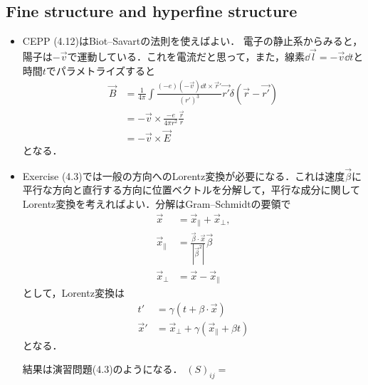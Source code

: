 \subsection{Fine structure and hyperfine structure}
\begin{itemize}
		\item CEPP (4.12)はBiot--Savartの法則を使えばよい．
				電子の静止系からみると，陽子は$-\vec{v} $で運動している．これを電流だと思って，また，線素$\dd{\vec{l}}=-\vec{v}\dd{t} $と時間$t $でパラメトライズすると
				\begin{align}
						\vec{B} &= \frac{1}{4\pi}\int\frac{(-e)(-\vec{v})\dd{t}\times\vec{r}'}{(r')^3}\vec{r'}\delta(\vec{r} - \vec{r'})\\
								&= -\vec{v}\times \frac{-e}{4\pi r^2}\frac{\vec{r}}{r}\\
								&= -\vec{v} \times \vec{E}
				\end{align}
				となる．
		\item Exercise (4.3)では一般の方向へのLorentz変換が必要になる．これは速度$\vec{\beta} $に平行な方向と直行する方向に位置ベクトルを分解して，平行な成分に関してLorentz変換を考えればよい．分解はGram--Schmidtの要領で
				\begin{align}
						\vec{x} &= \vec{x}_{\parallel}+\vec{x}_{\perp},\\
						\vec{x}_{\parallel} &= \frac{\vec{\beta}\cdot\vec{x}}{|\vec{\beta}^2|}\vec{\beta}\\
						\vec{x}_{\perp} &= \vec{x} - \vec{x}_{\parallel}
				\end{align}
				として，Lorentz変換は
				\begin{align}
						t' &= \gamma(t + \beta \cdot \vec{x})\\
						\vec{x}' &= \vec{x}_{\perp} + \gamma(\vec{x}_{\parallel} + \beta t)
				\end{align}
				となる．
				
				結果は演習問題(4.3)のようになる．
				$(S)_{ij}=$
\end{itemize}
